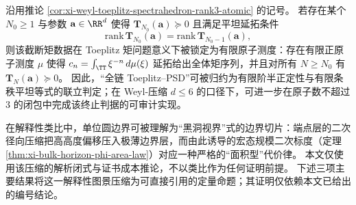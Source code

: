 \begin{corollary}\label{cor:xi-toeplitz-flat-extension-finite-termination}
沿用推论 \ref{cor:xi-weyl-toeplitz-spectrahedron-rank3-atomic} 的记号。
若存在某个 \(N_0\ge 1\) 与参数 \(\mathbf{a}\in\RR^d\) 使得 \(\mathbf{T}_{N_0}(\mathbf{a})\succeq 0\) 且满足平坦延拓条件
\[
\mathrm{rank}\,\mathbf{T}_{N_0}(\mathbf{a})=\mathrm{rank}\,\mathbf{T}_{N_0-1}(\mathbf{a}),
\]
则该截断矩数据在 Toeplitz 矩问题意义下被锁定为有限原子测度：存在有限正原子测度 \(\mu\) 使得 \(c_n=\int_{\TT}\xi^{-n}\,d\mu(\xi)\) 延拓给出全体矩序列，并且对所有 \(N\ge N_0\) 有 \(\mathbf{T}_N(\mathbf{a})\succeq 0\)。
因此，“全链 Toeplitz--PSD”可被归约为有限阶半正定性与有限条秩平坦等式的联立判定；在 Weyl-压缩 \(d\le 6\) 的口径下，可进一步在原子数不超过 \(3\) 的闭包中完成该终止判据的可审计实现。
\end{corollary}

在解释性类比中，单位圆边界可被理解为“黑洞视界”式的边界切片：端点层的二次径向压缩把高高度偏移压入极薄边界层，而由此诱导的宏态规模二次标度（定理 \ref{thm:xi-bulk-horizon-phi-area-law}）对应一种严格的“面积型”代价律。
本文仅使用该压缩的解析闭式与证书成本推论，不以类比作为任何证明前提。
下述三项主要结果将这一解释性图景压缩为可直接引用的定量命题；其证明仅依赖本文已给出的编号结论。

